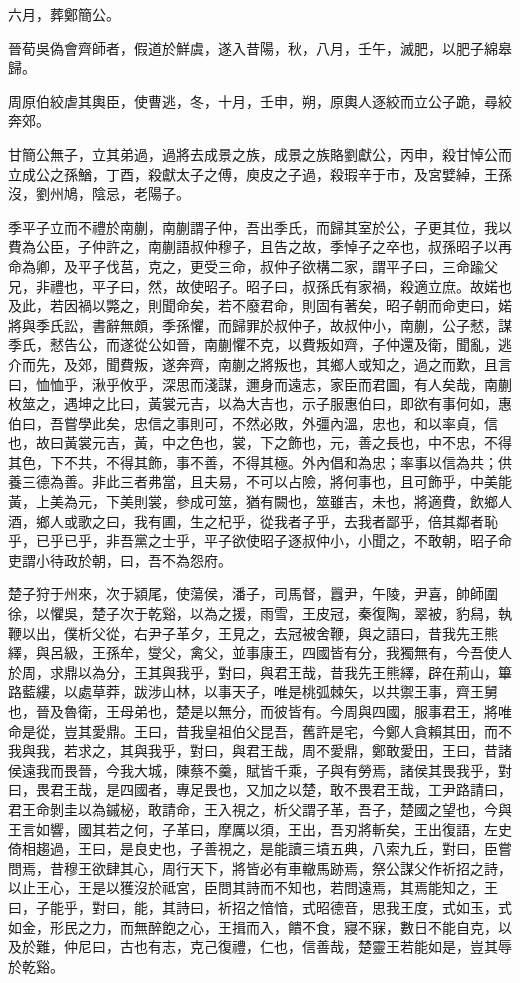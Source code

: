 \begin{pinyinscope}
六月，葬鄭簡公。

晉荀吳偽會齊師者，假道於鮮虞，遂入昔陽，秋，八月，壬午，滅肥，以肥子綿皋歸。

周原伯絞虐其輿臣，使曹逃，冬，十月，壬申，朔，原輿人逐絞而立公子跪，尋絞奔郊。

甘簡公無子，立其弟過，過將去成景之族，成景之族賂劉獻公，丙申，殺甘悼公而立成公之孫鰌，丁酉，殺獻太子之傅，庾皮之子過，殺瑕辛于市，及宮嬖綽，王孫沒，劉州鳩，陰忌，老陽子。

季平子立而不禮於南蒯，南蒯謂子仲，吾出季氏，而歸其室於公，子更其位，我以費為公臣，子仲許之，南蒯語叔仲穆子，且告之故，季悼子之卒也，叔孫昭子以再命為卿，及平子伐莒，克之，更受三命，叔仲子欲構二家，謂平子曰，三命踰父兄，非禮也，平子曰，然，故使昭子。昭子曰，叔孫氏有家禍，殺適立庶。故婼也及此，若因禍以斃之，則聞命矣，若不廢君命，則固有著矣，昭子朝而命吏曰，婼將與季氏訟，書辭無頗，季孫懼，而歸罪於叔仲子，故叔仲小，南蒯，公子憖，謀季氏，憖告公，而遂從公如晉，南蒯懼不克，以費叛如齊，子仲還及衛，聞亂，逃介而先，及郊，聞費叛，遂奔齊，南蒯之將叛也，其鄉人或知之，過之而歎，且言曰，恤恤乎，湫乎攸乎，深思而淺謀，邇身而遠志，家臣而君圖，有人矣哉，南蒯枚筮之，遇坤之比曰，黃裳元吉，以為大吉也，示子服惠伯曰，即欲有事何如，惠伯曰，吾嘗學此矣，忠信之事則可，不然必敗，外彊內溫，忠也，和以率貞，信也，故曰黃裳元吉，黃，中之色也，裳，下之飾也，元，善之長也，中不忠，不得其色，下不共，不得其飾，事不善，不得其極。外內倡和為忠；率事以信為共；供養三德為善。非此三者弗當，且夫易，不可以占險，將何事也，且可飾乎，中美能黃，上美為元，下美則裳，參成可筮，猶有闕也，筮雖吉，未也，將適費，飲鄉人酒，鄉人或歌之曰，我有圃，生之杞乎，從我者子乎，去我者鄙乎，倍其鄰者恥乎，已乎已乎，非吾黨之士乎，平子欲使昭子逐叔仲小，小聞之，不敢朝，昭子命吏謂小待政於朝，曰，吾不為怨府。

楚子狩于州來，次于潁尾，使蕩侯，潘子，司馬督，囂尹，午陵，尹喜，帥師圍徐，以懼吳，楚子次于乾谿，以為之援，雨雪，王皮冠，秦復陶，翠被，豹舄，執鞭以出，僕析父從，右尹子革夕，王見之，去冠被舍鞭，與之語曰，昔我先王熊繹，與呂級，王孫牟，燮父，禽父，並事康王，四國皆有分，我獨無有，今吾使人於周，求鼎以為分，王其與我乎，對曰，與君王哉，昔我先王熊繹，辟在荊山，篳路藍縷，以處草莽，跋涉山林，以事天子，唯是桃弧棘矢，以共禦王事，齊王舅也，晉及魯衛，王母弟也，楚是以無分，而彼皆有。今周與四國，服事君王，將唯命是從，豈其愛鼎。王曰，昔我皇祖伯父昆吾，舊許是宅，今鄭人貪賴其田，而不我與我，若求之，其與我乎，對曰，與君王哉，周不愛鼎，鄭敢愛田，王曰，昔諸侯遠我而畏晉，今我大城，陳蔡不羹，賦皆千乘，子與有勞焉，諸侯其畏我乎，對曰，畏君王哉，是四國者，專足畏也，又加之以楚，敢不畏君王哉，工尹路請曰，君王命剝圭以為鏚柲，敢請命，王入視之，析父謂子革，吾子，楚國之望也，今與王言如響，國其若之何，子革曰，摩厲以須，王出，吾刃將斬矣，王出復語，左史倚相趨過，王曰，是良史也，子善視之，是能讀三墳五典，八索九丘，對曰，臣嘗問焉，昔穆王欲肆其心，周行天下，將皆必有車轍馬跡焉，祭公謀父作祈招之詩，以止王心，王是以獲沒於祗宮，臣問其詩而不知也，若問遠焉，其焉能知之，王曰，子能乎，對曰，能，其詩曰，祈招之愔愔，式昭德音，思我王度，式如玉，式如金，形民之力，而無醉飽之心，王揖而入，饋不食，寢不寐，數日不能自克，以及於難，仲尼曰，古也有志，克己復禮，仁也，信善哉，楚靈王若能如是，豈其辱於乾谿。


\end{pinyinscope}
